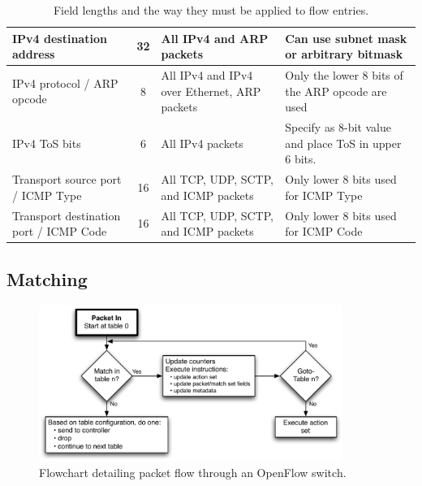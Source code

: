 \documentclass[10pt]{article}
\begin{document}
\begin{table}[hbp]
\begin{tabularx}{\textwidth}{ |X|c|X|X| }
\hline IPv4 destination address & 32 & All IPv4 and ARP packets & Can use subnet mask or arbitrary bitmask \\
\hline IPv4 protocol / ARP opcode & 8 & All IPv4 and IPv4 over Ethernet, ARP packets & Only the lower 8 bits of the ARP opcode are used \\
\hline IPv4 ToS bits & 6 & All IPv4 packets & Specify as 8-bit value and place ToS in upper 6 bits. \\
\hline Transport source port / ICMP Type & 16 & All TCP, UDP, SCTP, and ICMP packets & Only lower 8 bits used for ICMP Type \\
\hline Transport destination port / ICMP Code & 16 & All TCP, UDP, SCTP, and ICMP packets & Only lower 8 bits used for ICMP Code \\
\hline
\end{tabularx}
\caption{Field lengths and the way they must be applied to flow entries.}
\label{table:header field details}
\end{table}

\subsection{Matching}
\label{sec:matching}
\begin{figure}[!htb]
\centering
\includegraphics[height=2.0in]{packet_flow_flowchart}
\caption{Flowchart detailing packet flow through an OpenFlow switch.}
\label{fig:packet_flow}
\end{figure}
\end{document}
